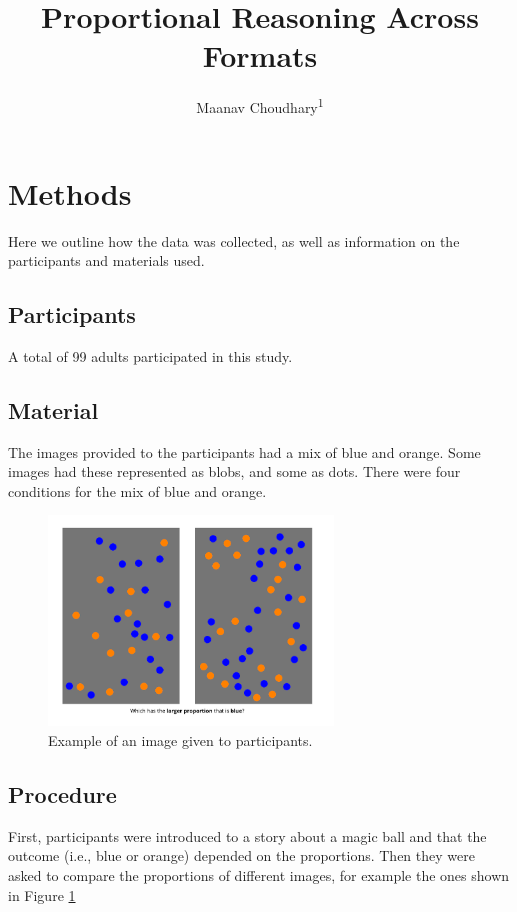 \documentclass[
  man,floatsintext]{apa6}
\title{Proportional Reasoning Across Formats}
\author{Maanav Choudhary\textsuperscript{1}}
\date{}
\affiliation{\vspace{0.5cm}\textsuperscript{1} Rutgers University}
\begin{document}
\maketitle

\section{Methods}\label{methods}

Here we outline how the data was collected, as well as information on the participants and materials used.

\subsection{Participants}\label{participants}

A total of 99 adults participated in this study.

\subsection{Material}\label{material}

The images provided to the participants had a mix of blue and orange. Some images had these represented as blobs, and some as dots. There were four conditions for the mix of blue and orange.

\begin{figure}
\includegraphics[width=2.98in]{images_WA10/Probtask_Trial} \caption{Example of an image given to participants.}\label{fig:example-img}
\end{figure}

\subsection{Procedure}\label{procedure}

First, participants were introduced to a story about a magic ball and that the outcome (i.e., blue or orange) depended on the proportions. Then they were asked to compare the proportions of different images, for example the ones shown in Figure \ref{fig:example-img}
\end{document}
